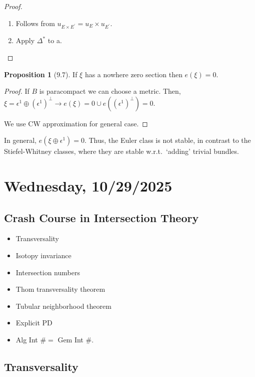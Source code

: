 \documentclass{article}
\theoremstyle{definition}
\newtheorem{proposition}[theorem]{Proposition}
\begin{document}
    \begin{proof}
        \begin{enumerate}[label=\alph*)]
            \item Follows from \(u_{E \times E^{\prime}} = u_E \times u_{E^{\prime} }\).
            \item Apply \(\Delta^{\ast}\) to a.  
        \end{enumerate} 
    \end{proof}

    \begin{proposition}
        [9.7] If \(\xi\) has a nowhere zero section then \(e(\xi) = 0\).
    \end{proposition}

    \begin{proof}
        If \(B\) is paracompact we can choose a metric. Then, \(\xi = \epsilon^1 \oplus (\epsilon^1)^\perp \to e(\xi) = 0 \cup e((\epsilon^1)^\perp) = 0\).
        
        We use CW approximation for general case.
    \end{proof}

    In general, \(e(\xi \oplus \epsilon^1) = 0\). Thus, the Euler class is not stable, in contrast to the Stiefel-Whitney classes, where they are stable w.r.t.\ `adding' trivial bundles.
    
    \section*{Wednesday, 10/29/2025}
    
    \subsection*{Crash Course in Intersection Theory}

    \begin{itemize}
        \item Transversality
        \item Isotopy invariance
        \item Intersection numbers
        \item Thom transversality theorem
        \item Tubular neighborhood theorem
        \item Explicit PD
        \item Alg Int \(\# =\) Gem Int \(\# \).  
    \end{itemize} 

    \subsection*{Transversality}
\end{document}
